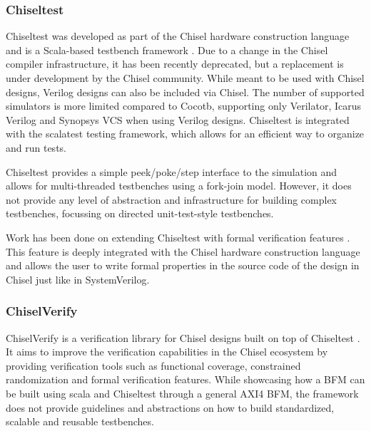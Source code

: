 \documentclass[11pt,a4paper]{report}
\begin{document}
\subsubsection{Chiseltest} %

Chiseltest was developed as part of the Chisel hardware construction language \cite{chiselpaper} and is a Scala-based testbench
framework \cite{chiseltest}. Due to a change in the Chisel compiler infrastructure, it has been recently deprecated,
but a replacement is under development by the Chisel community. While meant to be used with Chisel designs, Verilog
designs can also be included via Chisel. The number of supported simulators is more limited compared to Cocotb,
supporting only Verilator, Icarus Verilog and Synopsys VCS when using Verilog designs. Chiseltest is integrated with
the scalatest testing framework, which allows for an efficient way to organize and run tests.

Chiseltest provides a simple peek/poke/step interface to the simulation and allows for multi-threaded testbenches
using a fork-join model. However, it does not provide any
level of abstraction and infrastructure for building complex
testbenches, focussing on directed unit-test-style testbenches.

Work has been done on extending Chiseltest with formal verification features \cite{laeufer2021open}. This feature is deeply integrated with the Chisel hardware construction language and allows the user to write formal properties in the source code of the design in Chisel just like in SystemVerilog.

\subsubsection{ChiselVerify} %

ChiselVerify is a verification library for Chisel designs built on top of Chiseltest \cite{chiselverify}. It aims to
improve the verification capabilities in the Chisel ecosystem by providing verification tools such as functional
coverage, constrained randomization and formal verification features. While showcasing how a BFM can be built using
scala and Chiseltest through a general AXI4 BFM, the framework does not provide guidelines and abstractions on how to
build standardized, scalable and reusable testbenches.
\end{document}
